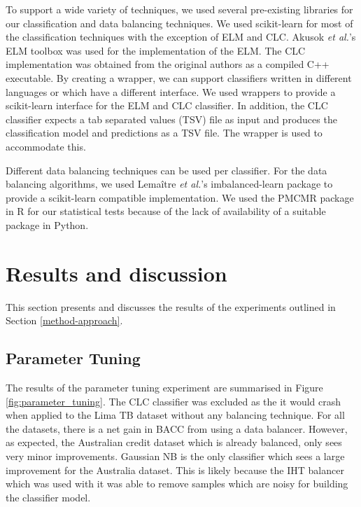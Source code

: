 \documentclass{sig-alternate-05-2015}
\begin{document}
	To support a wide variety of techniques, we used several pre-existing libraries for our classification and data balancing techniques. We used scikit-learn \cite{scikit-learn} for most of the classification techniques with the exception of ELM and CLC. Akusok \textit{et al.}'s \cite{7140733} ELM toolbox was used for the implementation of the ELM. The CLC implementation was obtained from the original authors \cite{Chen2006} as a compiled C++ executable. By creating a wrapper, we can support classifiers written in different languages or which have a different interface. We used wrappers to provide a scikit-learn interface for the ELM and CLC classifier. In addition, the CLC classifier expects a tab separated values (TSV) file as input and produces the classification model and predictions as a TSV file. The wrapper is used to accommodate this.
	
	Different data balancing techniques can be used per classifier. For the data balancing algorithms, we used Lema\^{i}tre \textit{et al.}'s \cite{lemaitre2016imbalanced} imbalanced-learn package to provide a scikit-learn compatible implementation. We used the PMCMR \cite{pmcmr} package in R for our statistical tests because of the lack of availability of a suitable package in Python.
	
	\section{Results and discussion}
	\label{results}
	This section presents and discusses the results of the experiments outlined in Section \ref{method-approach}.
	\subsection{Parameter Tuning}
	\label{sec:parameter_tuning}
	The results of the parameter tuning experiment are summarised in Figure \ref{fig:parameter_tuning}. The CLC classifier was excluded as the it would crash when applied to the Lima TB dataset without any balancing technique. For all the datasets, there is a net gain in BACC from using a data balancer. However, as expected, the Australian credit dataset which is already balanced, only sees very minor improvements. Gaussian NB is the only classifier which sees a large improvement for the Australia dataset. This is likely because the IHT balancer which was used with it was able to remove samples which are noisy for building the classifier model. 
	
\end{document}
